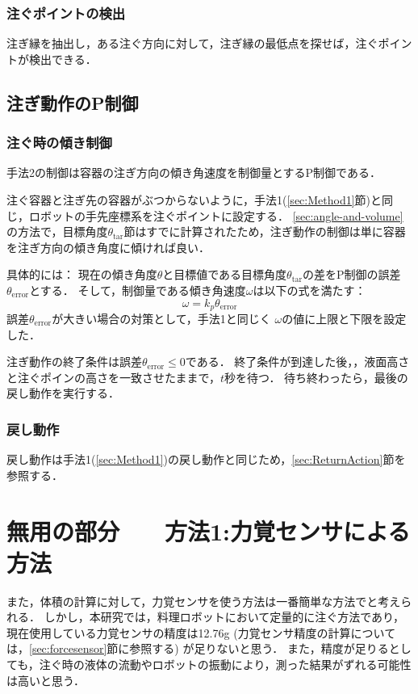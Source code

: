 		\subsubsection{注ぐポイントの検出}
		注ぎ縁を抽出し，ある注ぐ方向に対して，注ぎ縁の最低点を探せば，注ぐポイントが検出できる．
		
	\subsection{注ぎ動作のP制御}
		\subsubsection{注ぐ時の傾き制御}
		手法2の制御は容器の注ぎ方向の傾き角速度を制御量とするP制御である．
		
		注ぐ容器と注ぎ先の容器がぶつからないように，手法1(\ref{sec:Method1}節)と同じ，ロボットの手先座標系を注ぐポイントに設定する．
		\ref{sec:angle-and-volume}の方法で，目標角度$\theta_\mathrm{tar}節$はすでに計算されたため，注ぎ動作の制御は単に容器を注ぎ方向の傾き角度に傾ければ良い．
		
		具体的には：
		現在の傾き角度$\theta$と目標値である目標角度$\theta_\mathrm{tar}$の差をP制御の誤差$\theta_\mathrm{error}$とする．
		そして，制御量である傾き角速度$\omega$は以下の式を満たす：
		$$\omega=k_p \theta_\mathrm{error}$$
		誤差$\theta_\mathrm{error}$が大きい場合の対策として，手法1と同じく
		$\omega$の値に上限と下限を設定した．
		
		注ぎ動作の終了条件は誤差$\theta_\mathrm{error} \leq 0$である．
		終了条件が到達した後，，液面高さと注ぐポインの高さを一致させたままで，$t$秒を待つ．
		待ち終わったら，最後の戻し動作を実行する．
		
		\subsubsection{戻し動作}
		戻し動作は手法1(\ref{sec:Method1})の戻し動作と同じため，\ref{sec:ReturnAction}節を参照する．
	
	
		

















\iffalse
\section{無用の部分　　方法1:力覚センサによる方法}
また，体積の計算に対して，力覚センサを使う方法は一番簡単な方法でと考えられる．
しかし，本研究では，料理ロボットにおいて定量的に注ぐ方法であり，現在使用している力覚センサの精度は12.76g
(力覚センサ精度の計算については，\ref{sec:forcesensor}節に参照する)%
が足りないと思う．
また，精度が足りるとしても，注ぐ時の液体の流動やロボットの振動により，測った結果がずれる可能性は高いと思う．

